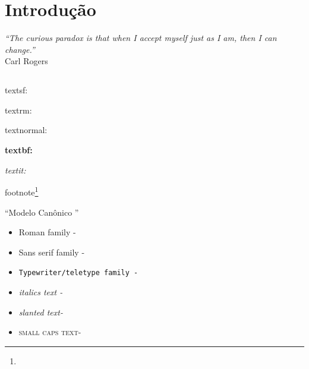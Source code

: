 

\cleardoublepage
{} %



\chapter[Introdução]{Introdução \showfont}




\begin{flushright}
	\textit{``The curious paradox is that when I accept myself just as I am, then I can change.''}\\
	Carl Rogers
\end{flushright}




\newpage


\section[Some encoding tests]{\showfont}
\subsection{\showfont}
\subsubsection{\showfont}
\subsubsubsection{\showfont}


\textsf{textsf: \showfont}

\textrm{textrm: \showfont}

\textnormal{textnormal: \showfont}

\textbf{textbf: \showfont}

\textit{textit: \showfont}

footnote\footnote{\showfont}


``Modelo Canônico \showfont''

\begin{itemize}
	\item \textrm{Roman family - \showfont }
	\item \textsf{Sans serif family - \showfont}
	\item \texttt{Typewriter/teletype family - \showfont}
	\item \textit{italics text - \showfont}
	\item \textsl{slanted text- \showfont}
	\item \textsc{small caps text- \showfont}
\end{itemize}





